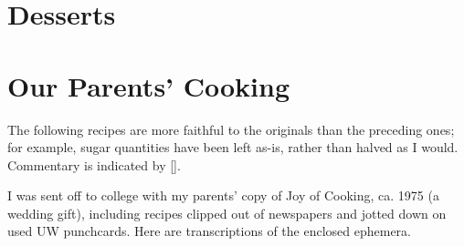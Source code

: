 \documentclass{article}
\begin{document}
\section{Desserts}





% 

\section{Our Parents' Cooking}
The following recipes are more faithful to the originals than the preceding ones; for example, sugar quantities have been left as-is, rather than halved as I would. Commentary is indicated by [].

I was sent off to college with my parents' copy of Joy of Cooking, ca. 1975 (a wedding gift), including recipes clipped out of newspapers and jotted down on used UW punchcards. Here are transcriptions of the enclosed ephemera.

%
%

\printindex
\end{document}
